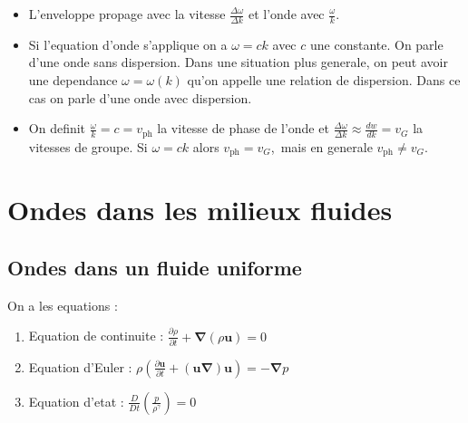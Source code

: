 \begin{remark}
\begin{itemize}
\item L'enveloppe propage avec la vitesse $\frac{\Delta \omega}{\Delta k}$ et l'onde avec $\frac{\omega}{k}$.
\item Si l'equation d'onde s'applique on a $\omega =ck$ avec $c$ une constante. On parle d'une onde sans dispersion. Dans une situation plus generale, on peut avoir une dependance $\omega=\omega(k)$ qu'on appelle une relation de dispersion. Dans ce cas on parle d'une onde avec dispersion.
\item On definit $\frac{\omega}{k}=c=v_{\mathrm{ph}}$ la vitesse de phase de l'onde et $\frac{\Delta \omega}{\Delta k}\approx \frac{dw}{dk}=v_{G}$ la vitesses de groupe. Si $\omega=ck$ alors $v_{\mathrm{ph}}=v_{G}$,\
mais en generale $v_{\mathrm{ph}}\neq v_{G}$.
\end{itemize}
\end{remark}

\chapter{Ondes dans les milieux fluides}

\section{Ondes dans un fluide uniforme}

On a les equations :
\begin{enumerate}
\item Equation de continuite : $\frac{ \partial \rho }{ \partial t }+\boldsymbol{\nabla}(\rho \boldsymbol{u})=0$
\item Equation d'Euler : $\rho\left( \frac{ \partial \boldsymbol{u} }{ \partial t }+(\boldsymbol{u\nabla})\boldsymbol{u} \right)=-\boldsymbol{\nabla}p$
\item Equation d'etat : $\frac{D}{Dt}\left( \frac{p}{\rho^{\gamma}} \right)=0$
\end{enumerate}

